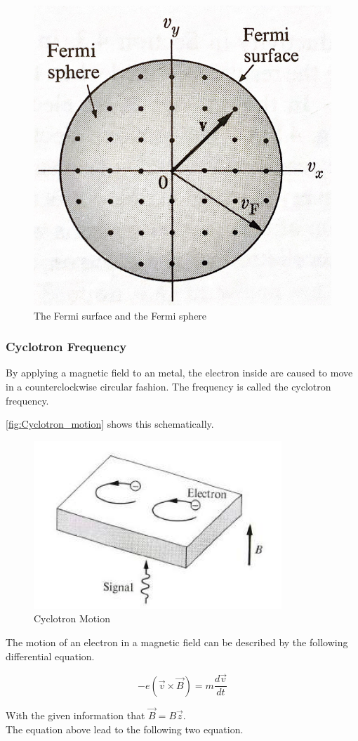 \begin{figure}[H]
    \centering
    \includegraphics[width=0.4\linewidth]{Graphics/Chapter1/Fermi_Sphere.png}
    \caption{The Fermi surface and the Fermi sphere \cite[Elementary Solid State Physics p. 268]{elementary_SSP} }
    \label{}
\end{figure}

\subsubsection*{Cyclotron Frequency}

By applying a magnetic field to an metal, the electron inside are 
caused to move in a counterclockwise circular fashion. 
The frequency is called the cyclotron frequency.

\autoref{fig:Cyclotron_motion} shows this schematically. 

\begin{figure}[H]
    \centering
    \includegraphics[width=0.4\linewidth]{Graphics/Chapter1/cyclotron_motion.png}
    \caption{Cyclotron Motion \cite[Elementary Solid State Physics p. 160]{elementary_SSP} }
    \label{fig:Cyclotron_motion}
\end{figure}

The motion of an electron in a magnetic field can be 
described by the following differential equation.

\begin{equation}
    -e (\vec{v} \times \vec{B}) =  m \frac{d\vec{v}}{dt}
\end{equation}

With the given information that $\vec{B} = B\vec{z}$.\\
The equation above lead to the following two 
equation.

